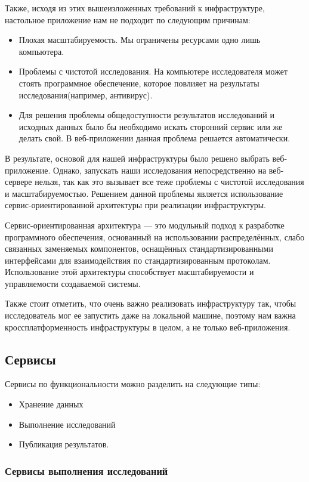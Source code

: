 \documentclass[12pt,a4paper]{extarticle}
\begin{document}
Также, исходя из этих вышеизложенных требований к инфраструктуре, настольное приложение нам не подходит по следующим причинам:
\begin{itemize}
	\item Плохая масштабируемость. Мы ограничены ресурсами одно лишь компьютера.
	\item Проблемы с чистотой исследования. На компьютере исследователя может стоять программное обеспечение, которое повлияет на результаты исследования(например, антивирус).
	\item Для решения проблемы общедоступности результатов исследований и исходных данных было бы необходимо искать сторонний сервис или же  делать свой. В веб-приложении данная проблема решается автоматически.
\end{itemize}

В результате, основой для нашей инфраструктуры было решено выбрать веб-приложение. Однако, запускать наши исследования непосредственно на веб-сервере нельзя, так как это вызывает все теже проблемы с чистотой исследования и масштабируемостью. Решением данной проблемы является использование сервис-ориентированной архитектуры при реализации инфраструктуры.

Сервис-ориентированная архитектура — это модульный подход к разработке программного обеспечения, основанный на использовании распределённых, слабо связанных заменяемых компонентов, оснащённых стандартизированными интерфейсами для взаимодействия по стандартизированным протоколам. Использование этой архитектуры способствует масштабируемости и управляемости создаваемой системы.	

Также стоит отметить, что очень важно реализовать инфраструктуру так, чтобы исследователь мог ее запустить даже на локальной машине, поэтому нам важна кроссплатформенность инфраструктуры в целом, а не только веб-приложения.

\subsection{Сервисы}
Сервисы по функциональности можно разделить на следующие типы:
\begin{itemize}
	\item Хранение данных
	\item Выполнение исследований
	\item Публикация результатов.
\end{itemize}

\subsubsection{Сервисы выполнения исследований}
\end{document}
